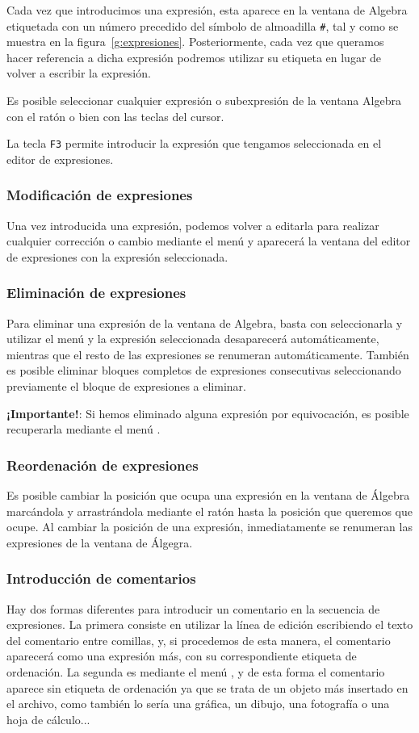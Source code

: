 Cada vez que introducimos una expresión, esta aparece en la ventana
de Algebra etiquetada con un número precedido del símbolo de
almoadilla \verb"#", tal y como se muestra en la
figura~\ref{g:expresiones}. Posteriormente, cada vez que queramos
hacer referencia a dicha expresión podremos utilizar su etiqueta en
lugar de volver a escribir la expresión.

Es posible seleccionar cualquier expresión o subexpresión de la
ventana Algebra con el ratón o bien con las teclas del cursor.

La tecla \texttt{F3} permite introducir la expresión que tengamos
seleccionada en el editor de expresiones.

\subsubsection*{Modificación de expresiones}
Una vez introducida una expresión, podemos volver a editarla para
realizar cualquier corrección o cambio mediante el menú
 y aparecerá la ventana del editor de
expresiones con la expresión seleccionada.
\subsubsection*{Eliminación de expresiones}
Para eliminar una expresión de la ventana de Algebra, basta con
seleccionarla y utilizar el menú  y la
expresión seleccionada desaparecerá automáticamente, mientras que el
resto de las expresiones se renumeran automáticamente. También es
posible eliminar bloques completos de expresiones consecutivas
seleccionando previamente el bloque de expresiones a eliminar.

\textbf{¡Importante!}: Si hemos eliminado alguna expresión por
equivocación, es posible recuperarla mediante el menú
.

\subsubsection*{Reordenación de expresiones}
Es posible cambiar la posición que ocupa una expresión en la ventana
de Álgebra marcándola y arrastrándola mediante el ratón hasta la
posición que queremos que ocupe. Al cambiar la posición de una
expresión, inmediatamente se renumeran las expresiones de la ventana
de Álgegra.

\subsubsection*{Introducción de comentarios}
Hay dos formas diferentes para introducir un comentario en la
secuencia de expresiones. La primera consiste en utilizar la línea
de edición escribiendo el texto del comentario entre comillas, y,
si procedemos de esta manera, el comentario aparecerá como una
expresión más, con su correspondiente etiqueta de ordenación. La
segunda es mediante el menú , y
de esta forma el comentario aparece sin etiqueta de ordenación ya
que se trata de un objeto más insertado en el archivo, como
también lo sería una gráfica, un dibujo, una fotografía o una hoja
de cálculo...

